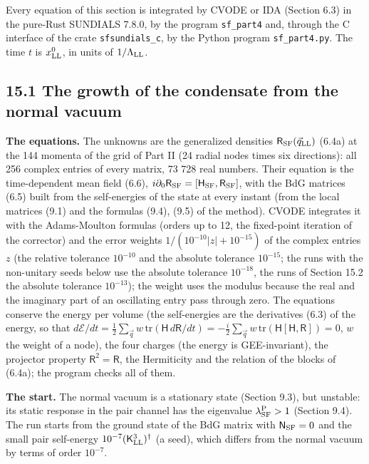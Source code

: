 \documentclass[
  10pt,
]{article}
\begin{document}
Every equation of this section is integrated by CVODE or IDA (Section
6.3) in the pure-Rust SUNDIALS 7.8.0, by the program \texttt{sf\_part4}
and, through the C interface of the crate \texttt{sfsundials\_c}, by the
Python program \texttt{sf\_part4.py}. The time \(t\) is
\(x^0_{\rm LL}\), in units of \(1/\Lambda_{\rm LL}\).

\hypertarget{the-growth-of-the-condensate-from-the-normal-vacuum}{%
\subsection{15.1 The growth of the condensate from the normal
vacuum}\label{the-growth-of-the-condensate-from-the-normal-vacuum}}

\textbf{The equations.} The unknowns are the generalized densities
\(\mathsf R_{\rm SF}(\vec q_{\rm LL})\) (6.4a) at the 144 momenta of the
grid of Part II (24 radial nodes times six directions): all 256 complex
entries of every matrix, 73 728 real numbers. Their equation is the
time-dependent mean field (6.6),
\(i\partial_0\mathsf R_{\rm SF}=[\mathsf H_{\rm SF},\mathsf R_{\rm SF}]\),
with the BdG matrices (6.5) built from the self-energies of the state at
every instant (from the local matrices (9.1) and the formulas (9.4),
(9.5) of the method). CVODE integrates it with the Adams-Moulton
formulas (orders up to 12, the fixed-point iteration of the corrector)
and the error weights \(1/(10^{-10}\lvert z\rvert+10^{-15})\) of the
complex entries \(z\) (the relative tolerance \(10^{-10}\) and the
absolute tolerance \(10^{-15}\); the runs with the non-unitary seeds
below use the absolute tolerance \(10^{-18}\), the runs of Section 15.2
the absolute tolerance \(10^{-13}\)); the weight uses the modulus
because the real and the imaginary part of an oscillating entry pass
through zero. The equations conserve the energy per volume (the
self-energies are the derivatives (6.3) of the energy, so that
\(d\mathcal E/dt=\tfrac12\sum_{\vec q}w\,\mathrm{tr}(\mathsf H\,d\mathsf R/dt)=-\tfrac i2\sum_{\vec q}w\,\mathrm{tr}(\mathsf H[\mathsf H,\mathsf R])=0\),
\(w\) the weight of a node), the four charges (the energy is
GEE-invariant), the projector property \(\mathsf R^2=\mathsf R\), the
Hermiticity and the relation of the blocks of (6.4a); the program checks
all of them.

\textbf{The start.} The normal vacuum is a stationary state (Section
9.3), but unstable: its static response in the pair channel has the
eigenvalue \(\lambda^{\rm P}_{\rm SF}>1\) (Section 9.4). The run starts
from the ground state of the BdG matrix with \(\mathsf N_{\rm SF}=0\)
and the small pair self-energy \(10^{-7}(\mathsf K^3_{\rm LL})^\dagger\)
(a seed), which differs from the normal vacuum by terms of order
\(10^{-7}\).
\end{document}
